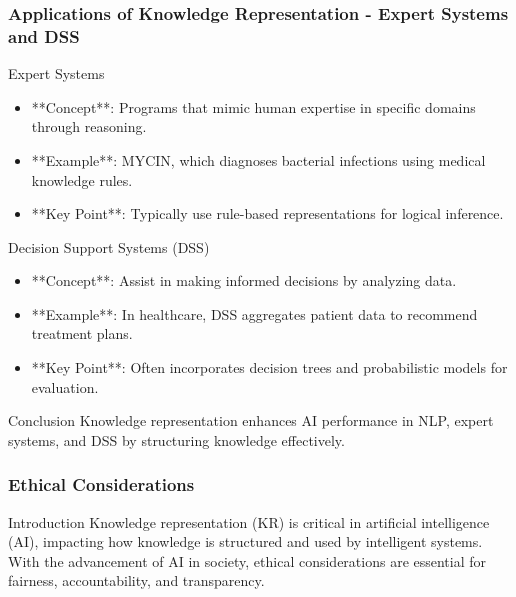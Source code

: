 \documentclass[aspectratio=169]{beamer}
\begin{document}
\begin{frame}[fragile]
    \frametitle{Applications of Knowledge Representation - Expert Systems and DSS}
    \begin{block}{Expert Systems}
        \begin{itemize}
            \item **Concept**: Programs that mimic human expertise in specific domains through reasoning.
            \item **Example**: MYCIN, which diagnoses bacterial infections using medical knowledge rules.
            \item **Key Point**: Typically use rule-based representations for logical inference.
        \end{itemize}
    \end{block}
    
    \begin{block}{Decision Support Systems (DSS)}
        \begin{itemize}
            \item **Concept**: Assist in making informed decisions by analyzing data.
            \item **Example**: In healthcare, DSS aggregates patient data to recommend treatment plans.
            \item **Key Point**: Often incorporates decision trees and probabilistic models for evaluation.
        \end{itemize}
    \end{block}
    
    \begin{block}{Conclusion}
        Knowledge representation enhances AI performance in NLP, expert systems, and DSS by structuring knowledge effectively.
    \end{block}
\end{frame}

\begin{frame}[fragile]
    \frametitle{Ethical Considerations}
    \begin{block}{Introduction}
        Knowledge representation (KR) is critical in artificial intelligence (AI), impacting how knowledge is structured and used by intelligent systems. With the advancement of AI in society, ethical considerations are essential for fairness, accountability, and transparency.
    \end{block}
\end{frame}
\end{document}
